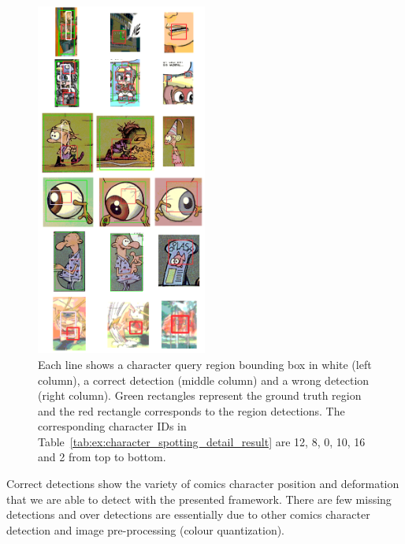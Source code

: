  \begin{figure}[!h]  %
   \centering
  \includegraphics[width=0.5\textwidth]{result_exemples.png}
  \caption[Character spotting result sample]{
  Each line shows a character query region bounding box in white (left column), a correct detection (middle column) and a wrong detection (right column). Green rectangles represent the ground truth region and the red rectangle corresponds to the region detections. The corresponding character IDs in Table~\ref{tab:ex:character_spotting_detail_result} are 12, 8, 0, 10, 16 and 2 from top to bottom. %
  }
  \label{fig:ex:character_spotting_results}
 \end{figure}

Correct detections show the variety of comics character position and deformation that we are able to detect with the presented framework. There are few missing detections and over detections are essentially due to other comics character detection and image pre-processing (colour quantization).

